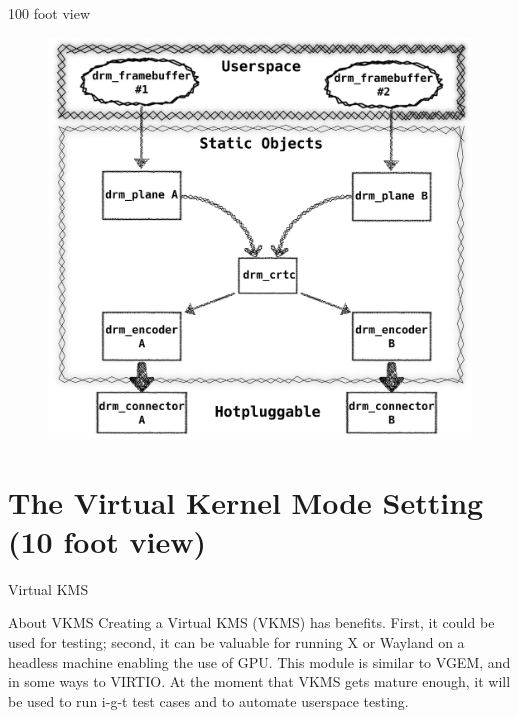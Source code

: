 \documentclass[10pt, compress, aspectratio=169]{beamer}
\begin{document}
\begin{frame}{100 foot view}
  \begin{figure}
    \centering
    \includegraphics[width=\linewidth,
                     height=0.8\textheight,
                     keepaspectratio]{drm_internals-min}
  \end{figure}
\end{frame}

\section{The Virtual Kernel Mode Setting (10 foot view)}

\begin{frame}{Virtual KMS}
  \begin{exampleblock}{About VKMS}
Creating a Virtual KMS (VKMS) has benefits. First, it could be used for
testing; second, it can be valuable for running X or Wayland on a headless
machine enabling the use of GPU. This module is similar to VGEM, and in some
ways to VIRTIO. At the moment that VKMS gets mature enough, it will be used to
run i-g-t test cases and to automate userspace testing.
  \end{exampleblock}
\end{frame}
\end{document}
